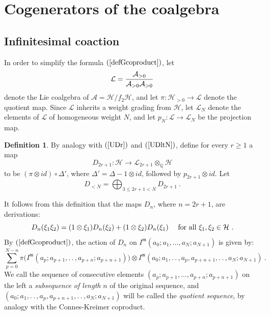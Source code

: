 \documentclass[10pt]{amsart}
\theoremstyle{definition}
\newtheorem{defn}[thm]{Definition}
\theoremstyle{remark}
\numberwithin{equation}{section}
\newcommand{\Ho}{\mathcal{H}}
\newcommand{\Ao}{\mathcal{A}}
\newcommand{\Imot}{I^{\mathfrak{m}}}
\newcommand{\Q}{\mathbb Q}
\newcommand{\Lo}{\mathcal{L}}
\newcommand{\To}{\longrightarrow}
\newcommand{\tdots}{.\, .\,}
\begin{document}
\section{Cogenerators of the coalgebra} 

\subsection{Infinitesimal coaction}
In order to simplify the formula $(\ref{defGcoproduct})$, let 
\begin{equation}\label{Ldef}
\Lo = {\Ao_{>0} \over \Ao_{>0} \Ao_{>0}}\end{equation}
denote the Lie coalgebra of $\Ao=\Ho/ f_2\Ho$, and let $\pi:\Ho_{>0}\rightarrow \Lo$ denote the quotient map.  Since $\Lo$ inherits a weight grading from $\Ho$, let  $\Lo_{N}$ denote the elements of $\Lo$ of homogeneous weight $N$, and let $p_N: \Lo \rightarrow \Lo_{N}$ be  the projection map.

\begin{defn} \label{defnDronH} By analogy with $(\ref{UDr})$ and $(\ref{UDltN})$, define for every $r\geq 1$   a map
$$D_{2r+1} : \Ho \To \Lo_{2r+1}\otimes_{\Q} \Ho $$
 to be  $( \pi\otimes id) \circ \Delta'$, where $\Delta'=\Delta-1\otimes id$,  followed by  $p_{2r+1}\otimes id$.  Let
 \begin{equation}\label{DNdef} D_{<N}= \bigoplus_{3\leq 2r+1<N} D_{2r+1}\ . \end{equation}
 \end{defn}
  
It follows from  this definition  that the maps $D_{n}$, where $n=2r+1$, are derivations:
\begin{equation} \label{Drarederivations} 
D_{n} (\xi_1 \xi_2) = (1 \otimes  \xi_1) D_{n} (\xi_2) + (1 \otimes \xi_2) D_{n}(\xi_1)  \quad \hbox{ for all } \xi_1,\xi_2 \in \Ho \ .
\end{equation} 
By  $(\ref{defGcoproduct})$, the action of $D_n$  on $ \Imot(a_0;a_1,\ldots, a_N;a_{N+1})$ is given    by:
\begin{equation}\label{mainformula}   
 \sum_{p=0}^{N-n} \pi \big(\Imot(a_{p} ;a_{p+1},\tdots, a_{p+n}; a_{p+n+1})\big) \otimes   \Imot(a_{0}; a_1, \tdots, a_{p}, a_{p+n+1}, \tdots ,  a_N ;a_{N+1})  \ .\end{equation}
  We call the  sequence of consecutive elements $(a_p; a_{p+1},\ldots,a_{p+n}; a_{p+n+1})$ on the left  a \emph{subsequence of length} $n$  of the original sequence, 
  and $( a_0;a_1, \tdots, a_{p}, a_{p+n+1}, \tdots ,  a_N;a_{N+1})$  will be called the \emph{quotient sequence}, by analogy with the Connes-Kreimer coproduct. 
  
\end{document}
